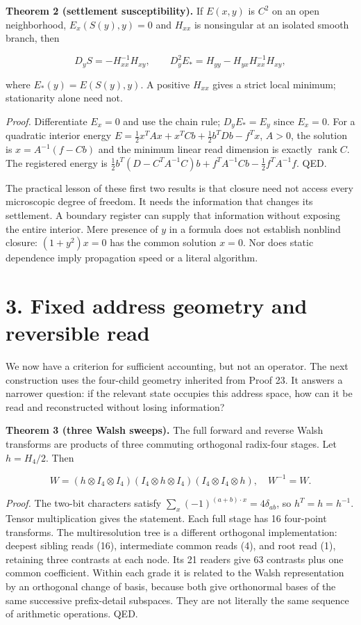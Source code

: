 \documentclass[
  11pt,
]{article}
\begin{document}
\textbf{Theorem 2 (settlement susceptibility).} If \(E(x,y)\) is \(C^2\)
on an open neighborhood, \(E_x(S(y),y)=0\) and \(H_{xx}\) is nonsingular
at an isolated smooth branch, then

\[D_yS=-H_{xx}^{-1}H_{xy},\qquad D_y^2E_* = H_{yy}-H_{yx}H_{xx}^{-1}H_{xy},\]

where \(E_*(y)=E(S(y),y)\). A positive \(H_{xx}\) gives a strict local
minimum; stationarity alone need not.

\emph{Proof.} Differentiate \(E_x=0\) and use the chain rule;
\(D_yE_*=E_y\) since \(E_x=0\). For a quadratic interior energy
\(E=\tfrac12x^TAx+x^TCb+\tfrac12b^TDb-f^Tx\), \(A>0\), the solution is
\(x=A^{-1}(f-Cb)\) and the minimum linear read dimension is exactly
\(\operatorname{rank}C\). The registered energy is
\(\tfrac12 b^T(D-C^TA^{-1}C)b+f^TA^{-1}Cb-\tfrac12 f^TA^{-1}f\). QED.

The practical lesson of these first two results is that closure need not
access every microscopic degree of freedom. It needs the information
that changes its settlement. A boundary register can supply that
information without exposing the entire interior. Mere presence of \(y\)
in a formula does not establish nonblind closure: \((1+y^2)x=0\) has the
common solution \(x=0\). Nor does static dependence imply propagation
speed or a literal algorithm.

\section{3. Fixed address geometry and reversible
read}\label{fixed-address-geometry-and-reversible-read}

We now have a criterion for sufficient accounting, but not an operator.
The next construction uses the four-child geometry inherited from Proof
23. It answers a narrower question: if the relevant state occupies this
address space, how can it be read and reconstructed without losing
information?

\textbf{Theorem 3 (three Walsh sweeps).} The full forward and reverse
Walsh transforms are products of three commuting orthogonal radix-four
stages. Let \(h=H_4/2\). Then

\[W=(h\otimes I_4\otimes I_4)(I_4\otimes h\otimes I_4)(I_4\otimes I_4\otimes h),\quad W^{-1}=W.\]

\emph{Proof.} The two-bit characters satisfy
\(\sum_x(-1)^{(a+b)\cdot x}=4\delta_{ab}\), so \(h^T=h=h^{-1}\). Tensor
multiplication gives the statement. Each full stage has 16 four-point
transforms. The multiresolution tree is a different orthogonal
implementation: deepest sibling reads (16), intermediate common reads
(4), and root read (1), retaining three contrasts at each node. Its 21
readers give 63 contrasts plus one common coefficient. Within each grade
it is related to the Walsh representation by an orthogonal change of
basis, because both give orthonormal bases of the same successive
prefix-detail subspaces. They are not literally the same sequence of
arithmetic operations. QED.
\end{document}
